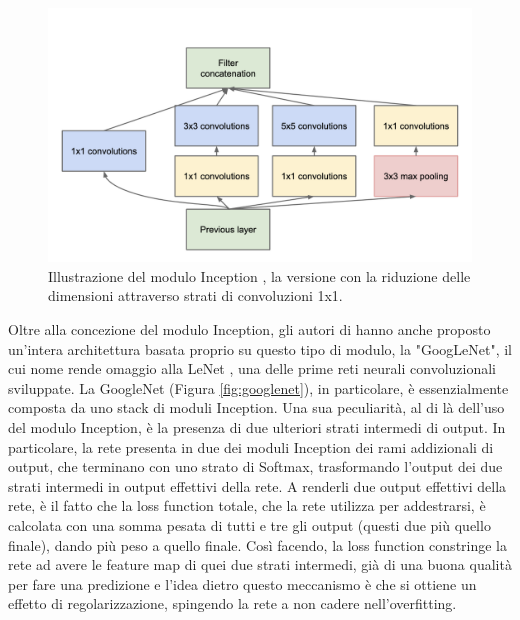 \begin{figure}[h!]
  \hspace*{0.6in}
  \includegraphics[scale=0.55]{img/inception.png}
  \caption{Illustrazione del modulo Inception \cite{inception}, la versione con la riduzione delle dimensioni attraverso strati di convoluzioni 1x1.}
  \label{fig:inception_module}
\end{figure}

Oltre alla concezione del modulo Inception, gli autori di \cite{inception} hanno anche proposto un'intera architettura basata proprio su questo tipo di modulo, la "GoogLeNet", il cui nome rende omaggio alla LeNet \cite{lenet}, una delle prime reti neurali convoluzionali sviluppate.
La GoogleNet (Figura \ref{fig:googlenet}), in particolare, è essenzialmente composta da uno stack di moduli Inception. Una sua peculiarità, al di là dell'uso del modulo Inception, è la presenza di due ulteriori strati intermedi di output. In particolare, la rete presenta in due dei moduli Inception dei rami addizionali di output, che terminano con uno strato di Softmax, trasformando l'output dei due strati intermedi in output effettivi della rete. A renderli due output effettivi della rete, è il fatto che la loss function totale, che la rete utilizza per addestrarsi, è calcolata con una somma pesata di tutti e tre gli output (questi due più quello finale), dando più peso a quello finale. Così facendo, la loss function  constringe la rete ad avere le feature map di quei due strati intermedi, già di una buona qualità per fare una predizione e l'idea dietro questo meccanismo è che si ottiene un effetto di regolarizzazione, spingendo la rete a non cadere nell'overfitting.


